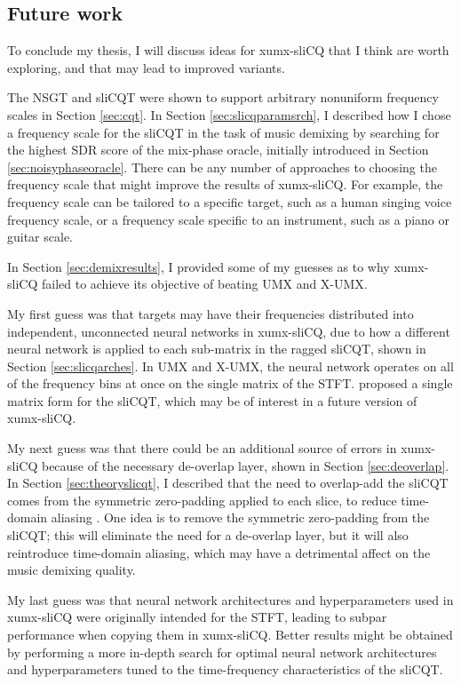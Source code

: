 \documentclass[report.tex]{subfiles}
\begin{document}
\subsection{Future work}

\begin{shaded}

To conclude my thesis, I will discuss ideas for xumx-sliCQ that I think are worth exploring, and that may lead to improved variants.

The NSGT and sliCQT were shown to support arbitrary nonuniform frequency scales in Section \ref{sec:cqt}. In Section \ref{sec:slicqparamsrch}, I described how I chose a frequency scale for the sliCQT in the task of music demixing by searching for the highest SDR score of the mix-phase oracle, initially introduced in Section \ref{sec:noisyphaseoracle}. There can be any number of approaches to choosing the frequency scale that might improve the results of xumx-sliCQ. For example, the frequency scale can be tailored to a specific target, such as a human singing voice frequency scale, or a frequency scale specific to an instrument, such as a piano or guitar scale.

In Section \ref{sec:demixresults}, I provided some of my guesses as to why xumx-sliCQ failed to achieve its objective of beating UMX and X-UMX.

My first guess was that targets may have their frequencies distributed into independent, unconnected neural networks in xumx-sliCQ, due to how a different neural network is applied to each sub-matrix in the ragged sliCQT, shown in Section \ref{sec:slicqarches}. In UMX and X-UMX, the neural network operates on all of the frequency bins at once on the single matrix of the STFT. \textcite{variableq1} proposed a single matrix form for the sliCQT, which may be of interest in a future version of xumx-sliCQ.

My next guess was that there could be an additional source of errors in xumx-sliCQ because of the necessary de-overlap layer, shown in Section \ref{sec:deoverlap}. In Section \ref{sec:theoryslicqt}, I described that the need to overlap-add the sliCQT comes from the symmetric zero-padding applied to each slice, to reduce time-domain aliasing \parencite{slicq}. One idea is to remove the symmetric zero-padding from the sliCQT; this will eliminate the need for a de-overlap layer, but it will also reintroduce time-domain aliasing, which may have a detrimental affect on the music demixing quality.

My last guess was that neural network architectures and hyperparameters used in xumx-sliCQ were originally intended for the STFT, leading to subpar performance when copying them in xumx-sliCQ. Better results might be obtained by performing a more in-depth search for optimal neural network architectures and hyperparameters tuned to the time-frequency characteristics of the sliCQT.

\end{shaded}
\end{document}
